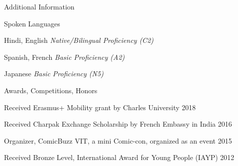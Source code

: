 \documentclass{resume}
\begin{document}

\begin{rSection}{Additional Information}
 
    \begin{rSubsection}{Spoken Languages}{}{}{}
        \item Hindi, English \hfill {\em Native/Bilingual Proficiency (C2)}
        \item Spanish, French \hfill {\em Basic Proficiency (A2)}
        \item Japanese \hfill {\em Basic Proficiency (N5)}
    \end{rSubsection}

    \begin{rSubsection}{Awards, Competitions, Honors}{}{}
    
        \item Received Erasmus+ Mobility grant by Charles University
            \hfill {2018}
        
        \item Received Charpak Exchange Scholarship by French Embassy in India 
            \hfill {2016}
        
        \item {Organizer, ComicBuzz VIT, a mini Comic-con, organized as an 
            event} \hfill {2015}
        
        \item Received Bronze Level, International Award for Young People (IAYP)
            \hfill {2012}
    
    \end{rSubsection}

\end{rSection}

\end{document}
